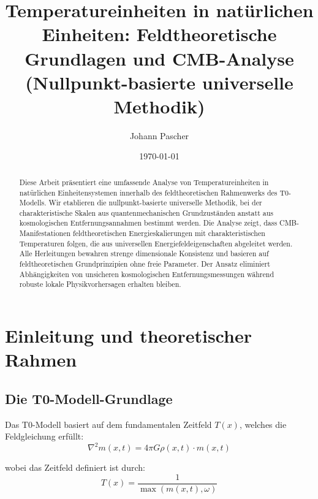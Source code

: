 \documentclass[12pt,a4paper]{article}
\newcommand{\Tfield}{T(x)}
\begin{document}
	
	\title{Temperatureinheiten in nat\"urlichen Einheiten: Feldtheoretische Grundlagen und CMB-Analyse \\
		(Nullpunkt-basierte universelle Methodik)}
	\author{Johann Pascher}
	\date{\today}
	
	\maketitle
	
	\begin{abstract}
		Diese Arbeit pr\"asentiert eine umfassende Analyse von Temperatureinheiten in nat\"urlichen Einheitensystemen innerhalb des feldtheoretischen Rahmenwerks des T0-Modells. Wir etablieren die nullpunkt-basierte universelle Methodik, bei der charakteristische Skalen aus quantenmechanischen Grundzust\"anden anstatt aus kosmologischen Entfernungsannahmen bestimmt werden. Die Analyse zeigt, dass CMB-Manifestationen feldtheoretischen Energieskalierungen mit charakteristischen Temperaturen folgen, die aus universellen Energiefeldeigenschaften abgeleitet werden. Alle Herleitungen bewahren strenge dimensionale Konsistenz und basieren auf feldtheoretischen Grundprinzipien ohne freie Parameter. Der Ansatz eliminiert Abh\"angigkeiten von unsicheren kosmologischen Entfernungsmessungen w\"ahrend robuste lokale Physikvorhersagen erhalten bleiben.
	\end{abstract}
	
	\tableofcontents
	\newpage
	
	\section{Einleitung und theoretischer Rahmen}
	\label{sec:introduction}
	
	\subsection{Die T0-Modell-Grundlage}
	\label{subsec:t0_foundation}
	
	Das T0-Modell basiert auf dem fundamentalen Zeitfeld $\Tfield$, welches die Feldgleichung erf\"ullt:
	\begin{equation}
		\nabla^2 m(x,t) = 4\pi G \rho(x,t) \cdot m(x,t)
	\end{equation}
	
	wobei das Zeitfeld definiert ist durch:
	\begin{equation}
		\Tfield = \frac{1}{\max(m(x,t), \omega)}
	\end{equation}
	
\end{document}
